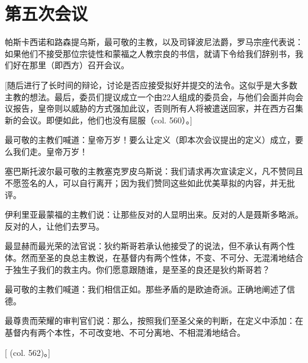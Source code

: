 
\section{第五次会议}

帕斯卡西诺和路森提乌斯，最可敬的主教，以及司铎波尼法爵，罗马宗座代表说：如果他们不接受那位宗徒性和蒙福之人教宗良的书信，就请下令给我们辞别书，我们好在那里（即西方）召开会议。\par

[随后进行了长时间的辩论，讨论是否应接受拟好并提交的法令。这似乎是大多数主教的想法。最后，委员们提议成立一个由22人组成的委员会，与他们会面并向会议报告，皇帝则以威胁的方式强加此议，否则所有人将被遣送回家，并在西方召集新的会议。即便如此，他们也没有屈服（col. 560）。]\par

最可敬的主教们喊道：皇帝万岁！要么让定义（即本次会议提出的定义）成立，要么我们走。皇帝万岁！\par

塞巴斯托波尔最可敬的主教塞克罗皮乌斯说：我们请求再次宣读定义，凡不赞同且不愿签名的人，可以自行离开；因为我们赞同这些如此优美草拟的内容，并无批评。\par

伊利里亚最蒙福的主教们说：让那些反对的人显明出来。反对的人是聂斯多略派。反对的人，让他们去罗马。\par

最显赫而最光荣的法官说：狄约斯哥若承认他接受了的说法，但不承认有两个性体。然而至圣的良总主教说，在基督内有两个性体，不变、不可分、无混淆地结合于独生子我们的救主内。你们愿意跟随谁，是至圣的良还是狄约斯哥若？\par

最可敬的主教们喊道：我们相信正如。那些矛盾的是欧迪奇派。正确地阐述了信德。\par

最尊贵而荣耀的审判官们说：那么，按照我们至圣父亲的判断，在定义中添加：在基督内有两个本性，不可改变地、不可分离地、不相混淆地结合。\par

[ (col. 562)。]\par

\par

